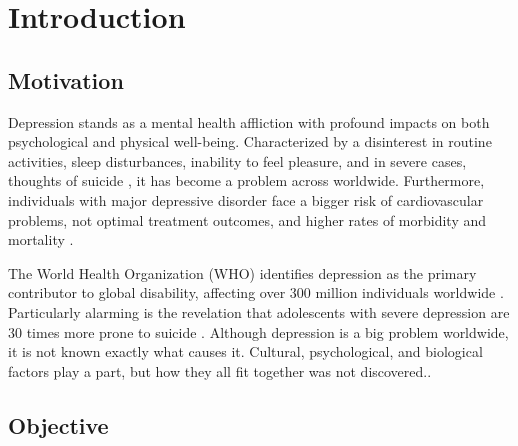 \documentclass[3p,times,procedia]{elsarticle}
\begin{document}
\begin{frontmatter}
\begin{abstract}
\end{abstract}





\end{frontmatter}






\section{Introduction}\label{introduction}

\subsection{Motivation}
\par \quad Depression stands as a mental health affliction with profound impacts on both psychological and physical well-being. Characterized by a disinterest in routine activities, sleep disturbances, inability to feel pleasure, and in severe cases, thoughts of suicide \cite{cui2015systematic}, it has become a problem across worldwide. Furthermore, individuals with major depressive disorder face a bigger risk of cardiovascular problems, not optimal treatment outcomes, and higher rates of morbidity and mortality \cite{luo2018effects}.

The World Health Organization (WHO) identifies depression as the primary contributor to global disability, affecting over 300 million individuals worldwide \cite{smith2014world}. Particularly alarming is the revelation that adolescents with severe depression are 30 times more prone to suicide \cite{stringaris2017depression}. 
Although depression is a big problem worldwide, it is not known exactly what causes it. Cultural, psychological, and biological factors play a part, but how they all fit together was not discovered.\cite{gross2014silver}.

\subsection{Objective}
\end{document}
